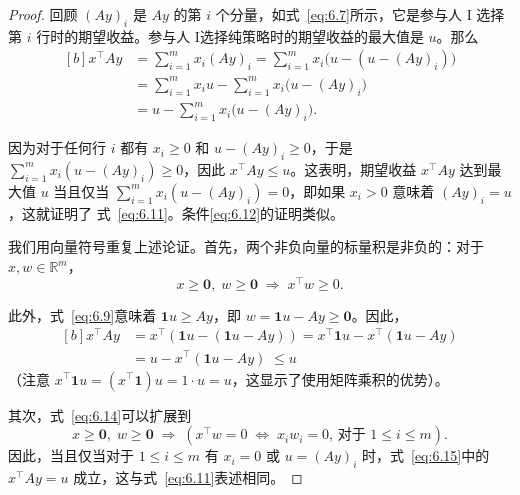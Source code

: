 \begin{proof}
回顾 \({\left( Ay\right) }_{i}\) 是 \({Ay}\) 的第 \(i\) 个分量，如式~\eqref{eq:6.7}所示，它是参与人 I 选择第 \(i\) 行时的期望收益。参与人 \(\mathrm{I}\)选择纯策略时的期望收益的最大值是 \(u\)。那么
\begin{equation} \label{eq:6.13}
\begin{aligned}[b] %
x^{\top}Ay
&= \sum_{i=1}^{m} x_i (Ay)_i  
= \sum_{i=1}^{m} x_i \bigl( u - (u - (Ay)_i ) \bigr) \\
&= \sum_{i=1}^{m} x_i u - \sum_{i=1}^{m} x_i \bigl( u - (Ay)_i \bigr) \\
&= u - \sum_{i=1}^{m} x_i \bigl( u - (Ay)_i \bigr).
\end{aligned}
\end{equation}


因为对于任何行 \(i\) 都有 \({x}_{i} \geq  0\) 和 \(u - {\left( Ay\right) }_{i} \geq  0\)，于是 \(\mathop{\sum }\limits_{{i = 1}}^{m}{x}_{i}\left( {u - {\left( Ay\right) }_{i}}\right)  \geq  0\)，因此 \({x}^{\top }{Ay} \leq  u\)。这表明，期望收益 \({x}^{\top }{Ay}\) 达到最大值 \(u\) 当且仅当 \(\mathop{\sum }\limits_{{i = 1}}^{m}{x}_{i}\left( {u - {\left( Ay\right) }_{i}}\right)  = 0\)，即如果 \({x}_{i} > 0\) 意味着 \({\left( Ay\right) }_{i} = u\)，这就证明了 式~\eqref{eq:6.11}。条件\eqref{eq:6.12}的证明类似。

我们用向量符号重复上述论证。首先，两个非负向量的标量积是非负的：对于 \(x,w \in  {\mathbb{R}}^{m}\)，
\begin{equation} \label{eq:6.14}
x \geq  \mathbf{0},\;w \geq  \mathbf{0}\; \Rightarrow  \;{x}^{\top }w \geq  0.
\end{equation}

此外，式~\eqref{eq:6.9}意味着 \(\mathbf{1}u \geq  {Ay}\)，即 \(w = \mathbf{1}u - {Ay} \geq  \mathbf{0}\)。因此，
\begin{equation} \label{eq:6.15}
\begin{aligned}[b] %
{x}^{\top }{Ay} &= {x}^{\top }\left( {\mathbf{1}u - \left( {\mathbf{1}u - {Ay}}\right) }\right)  = {x}^{\top }\mathbf{1}u - {x}^{\top }\left( {\mathbf{1}u - {Ay}}\right) \\
& = u - {x}^{\top }\left( {\mathbf{1}u - {Ay}}\right) \; \leq  u
\end{aligned}
\end{equation}
（注意 \({x}^{\top }\mathbf{1}u = \left( {{x}^{\top }\mathbf{1}}\right) u = 1 \cdot  u = u\)，这显示了使用矩阵乘积的优势）。

其次，式~\eqref{eq:6.14}可以扩展到
\begin{equation*}
x \geq  \mathbf{0},\;w \geq  \mathbf{0}\; \Rightarrow  \;\left( {{x}^{\top }w = 0\; \Leftrightarrow  \;{x}_{i}{w}_{i} = 0 \text{, 对于 }1 \leq  i \leq  m}\right).
\end{equation*}
因此，当且仅当对于 \(1 \leq  i \leq  m\) 有 \({x}_{i} = 0\) 或 \(u = {\left( Ay\right) }_{i}\) 时，式~\eqref{eq:6.15}中的 \({x}^{\top }{Ay} = u\) 成立，这与式~\eqref{eq:6.11}表述相同。
\end{proof}

